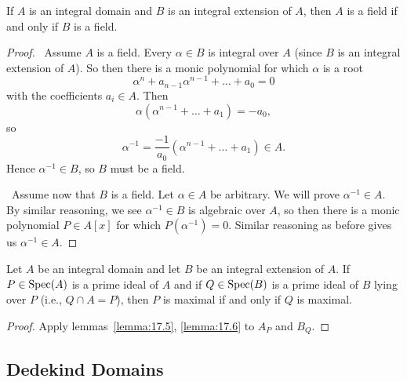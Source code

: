 
\lecture{}

\begin{lemma}\label{lemma:17.6}
If $A$ is an integral domain and $B$ is an integral extension of $A$,
then $A$ is a field if and only if $B$ is a field.
\end{lemma}

\begin{proof}
\forwardproof\ Assume $A$ is a field. Every $\alpha\in B$ is
integral over $A$ (since $B$ is an integral extension of $A$). So then
there is a monic polynomial for which $\alpha$ is a root
\begin{equation}
\alpha^{n}+a_{n-1}\alpha^{n-1}+\dots+a_{0}=0
\end{equation}
with the coefficients $a_{i}\in A$. Then
\begin{equation}
\alpha(\alpha^{n-1}+\dots+a_{1})=-a_{0},
\end{equation}
so
\begin{equation}
\alpha^{-1}=\frac{-1}{a_{0}}(\alpha^{n-1}+\dots+a_{1})\in A.
\end{equation}
Hence $\alpha^{-1}\in B$, so $B$ must be a field.

\backwardproof\ Assume now that $B$ is a field. Let $\alpha\in A$
be arbitrary. We will prove $\alpha^{-1}\in A$. By similar reasoning,
we see $\alpha^{-1}\in B$ is algebraic over $A$, so then there is a
monic polynomial $P\in A[x]$ for which $P(\alpha^{-1})=0$. Similar
reasoning as before gives us $\alpha^{-1}\in A$.
\end{proof}

\begin{corollary}\label{cor:17.7}
Let $A$ be an integral domain and let $B$ be an integral extension of $A$.
If $P\in\operatorname{Spec}(A)$ is a prime ideal of $A$ and if $Q\in\operatorname{Spec}(B)$ is a
prime ideal of $B$ lying over $P$ (i.e., $Q\cap A=P$), then $P$ is
maximal if and only if $Q$ is maximal.
\end{corollary}

\begin{proof}
Apply lemmas~\ref{lemma:17.5}, \ref{lemma:17.6} to $A_{P}$ and $B_{Q}$.
\end{proof}

\subsection{Dedekind Domains}

